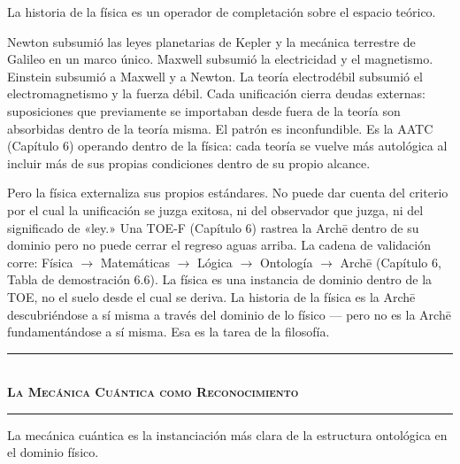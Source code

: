 \documentclass[10pt, openany, oneside]{book}
\renewcommand{\normalsize}{\fontsize{10}{13}\selectfont}
\begin{document}
\vspace{1em}

\noindent La historia de la física es un operador de completación sobre el espacio teórico.

Newton subsumió las leyes planetarias de Kepler y la mecánica terrestre de Galileo en un marco único. Maxwell subsumió la electricidad y el magnetismo. Einstein subsumió a Maxwell y a Newton. La teoría electrodébil subsumió el electromagnetismo y la fuerza débil. Cada unificación cierra deudas externas: suposiciones que previamente se importaban desde fuera de la teoría son absorbidas dentro de la teoría misma. El patrón es inconfundible. Es la AATC (Capítulo 6) operando dentro de la física: cada teoría se vuelve más autológica al incluir más de sus propias condiciones dentro de su propio alcance.

Pero la física externaliza sus propios estándares. No puede dar cuenta del criterio por el cual la unificación se juzga exitosa, ni del observador que juzga, ni del significado de «ley.» Una TOE-F (Capítulo 6) rastrea la Arch\={e} dentro de su dominio pero no puede cerrar el regreso aguas arriba. La cadena de validación corre: Física $\to$ Matemáticas $\to$ Lógica $\to$ Ontología $\to$ Arch\={e} (Capítulo 6, Tabla de demostración 6.6). La física es una instancia de dominio dentro de la TOE, no el suelo desde el cual se deriva. La historia de la física es la Arch\={e} descubriéndose a sí misma a través del dominio de lo físico --- pero no es la Arch\={e} fundamentándose a sí misma. Esa es la tarea de la filosofía.

\vspace{1.5em}


\begin{center}
    \rule{0.3\textwidth}{0.4pt}\\[0.5em]
    {\normalsize\bfseries\scshape La Mecánica Cuántica como Reconocimiento}\\[0.3em]
    \rule{0.3\textwidth}{0.4pt}
\end{center}

\vspace{1em}

\noindent La mecánica cuántica es la instanciación más clara de la estructura ontológica en el dominio físico.
\end{document}

